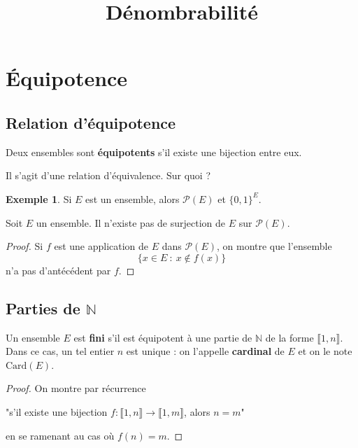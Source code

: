\documentclass[french]{article}
\title{Dénombrabilité}
\date{}
\newcommand{\N}{\mathbb{N}}
\newcommand{\card}{\text{Card}}
\theoremstyle{plain}
\theoremstyle{definition}
\newtheorem*{ex}{Exemple}
\theoremstyle{remark}
\begin{document}
\tableofcontents

\newpage
\maketitle

\section{Équipotence}

\subsection{Relation d'équipotence}

\begin{dfn}
	Deux ensembles sont \textbf{équipotents} s'il existe une bijection entre eux.
\end{dfn}
Il s'agit d'une relation d'équivalence. Sur quoi ?

\begin{ex}
	Si $E$ est un ensemble, alors $\mathcal{P}(E)$ et $\{0,1\}^E$.
\end{ex}

\begin{prop}%
	Soit $E$ un ensemble. Il n'existe pas de surjection de $E$ sur $\mathcal{P}(E)$.
\end{prop}
\begin{proof}
	Si $f$ est une application de $E$ dans $\mathcal{P}(E)$, on montre que l'ensemble $$\{x\in E\ : \ x\notin f(x)\}$$ n'a pas d'antécédent par $f$.
\end{proof}

\subsection{Parties de $\N$}

\begin{dfn}
	Un ensemble $E$ est \textbf{fini} s'il est équipotent à une partie de $\N$ de la forme $\llbracket1,n\rrbracket$. Dans ce cas, un tel entier $n$ est unique : on l'appelle \textbf{cardinal} de $E$ et on le note $\card(E)$.
\end{dfn}
\begin{proof}
	On montre par récurrence \begin{center}
		"s'il existe une bijection $f:\llbracket1,n\rrbracket\to\llbracket1,m\rrbracket$, alors $n=m$"
	\end{center} en se ramenant au cas où $f(n)=m$.
\end{proof}
\end{document}
